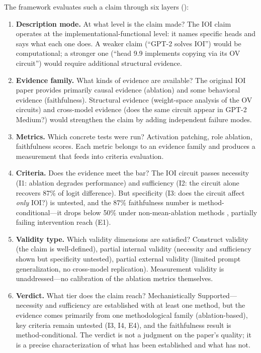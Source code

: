 \documentclass[10pt]{article}
\begin{document}
The framework evaluates such a claim through six layers ():

\begin{enumerate}[nosep]
\item \textbf{Description mode.} At what level is the claim made? The IOI claim operates at the implementational-functional level: it names specific heads and says what each one does. A weaker claim (``GPT-2 solves IOI'') would be computational; a stronger one (``head 9.9 implements copying via its OV circuit'') would require additional structural evidence.

\item \textbf{Evidence family.} What kinds of evidence are available? The original IOI paper provides primarily causal evidence (ablation) and some behavioral evidence (faithfulness). Structural evidence (weight-space analysis of the OV circuits) and cross-model evidence (does the same circuit appear in GPT-2 Medium?) would strengthen the claim by adding independent failure modes.

\item \textbf{Metrics.} Which concrete tests were run? Activation patching, role ablation, faithfulness scores. Each metric belongs to an evidence family and produces a measurement that feeds into criteria evaluation.

\item \textbf{Criteria.} Does the evidence meet the bar? The IOI circuit passes necessity (I1: ablation degrades performance) and sufficiency (I2: the circuit alone recovers 87\% of logit difference). But specificity (I3: does the circuit affect \emph{only} IOI?) is untested, and the 87\% faithfulness number is method-conditional---it drops below 50\% under non-mean-ablation methods \citep{miller2024transformer}, partially failing intervention reach (E1).

\item \textbf{Validity type.} Which validity dimensions are satisfied? Construct validity (the claim is well-defined), partial internal validity (necessity and sufficiency shown but specificity untested), partial external validity (limited prompt generalization, no cross-model replication). Measurement validity is unaddressed---no calibration of the ablation metrics themselves.

\item \textbf{Verdict.} What tier does the claim reach? Mechanistically Supported---necessity and sufficiency are established with at least one method, but the evidence comes primarily from one methodological family (ablation-based), key criteria remain untested (I3, I4, E4), and the faithfulness result is method-conditional. The verdict is not a judgment on the paper's quality; it is a precise characterization of what has been established and what has not.
\end{enumerate}
\end{document}
